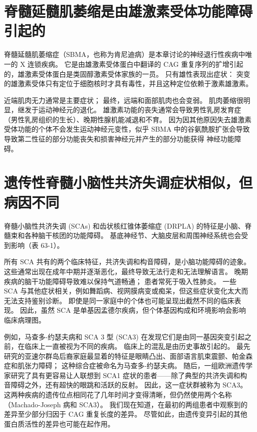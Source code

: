 \section{脊髓延髓肌萎缩是由雄激素受体功能障碍引起的}

脊髓延髓肌萎缩症（SBMA，也称为肯尼迪病）是本章讨论的神经退行性疾病中唯一的 X 连锁疾病。
它是由雄激素受体蛋白中翻译的 CAG 重复序列的扩增引起的，雄激素受体蛋白是类固醇激素受体家族的一员。
只有雄性表现出症状：
突变的雄激素受体只有定位于细胞核时才具有毒性，并且这种定位依赖于激素雄激素。


近端肌肉无力通常是主要症状；
最终，远端和面部肌肉也会变弱。
肌肉萎缩很明显，继发于运动神经元的退化。
雄激素功能的丧失通常会导致男性乳房发育症（男性乳房组织的生长）、晚期性腺机能减退和不育。
因为因其他原因失去雄激素受体功能的个体不会发生运动神经元变性，似乎 SBMA 中的谷氨酰胺扩张会导致导致第二性征的部分功能丧失和损害神经元并产生的部分功能获得 神经功能障碍。



\section{遗传性脊髓小脑性共济失调症状相似，但病因不同}

脊髓小脑性共济失调 (SCAs) 和齿状核红锥体萎缩症 (DRPLA) 的特征是小脑、脊髓束和各种脑干核团的功能障碍。
基底神经节、大脑皮层和周围神经系统也会受到影响（表 63-1）。


所有 SCA 共有的两个临床特征，共济失调和构音障碍，是小脑功能障碍的迹象。
这些通常出现在成年中期并逐渐恶化，最终导致无法行走和无法理解语言。
晚期疾病的脑干功能障碍导致难以保持气道畅通； 患者常死于吸入性肺炎。
一些 SCA 与其他症状相关，例如舞蹈病、视网膜病变或痴呆，但这些症状变化太大而无法支持鉴别诊断。
即使是同一家庭中的个体也可能呈现出截然不同的临床表现。
因此，虽然 SCA 是单基因孟德尔疾病，但个体基因构成和环境影响会影响临床病理图。


例如，马查多-约瑟夫病和 SCA 3 型 (SCA3) 在发现它们是由同一基因突变引起之前，在临床上一直被视为不同的疾病。
临床上的混乱是由历史事故引起的。
最先研究的亚速尔群岛后裔家庭最显着的特征是眼睛凸出、面部语言肌束震颤、帕金森症和肌张力障碍； 这种综合症被命名为马查多-约瑟夫病。
随后，一组欧洲遗传学家研究了具有更容易让人联想到 SCA1 症状的患者——除了典型的共济失调和构音障碍之外，还有超快的眼跳和活跃的反射。
因此，这一症状群被称为 SCA3。
这两种疾病的遗传位点相同花了几年时间才变得清晰，但仍然使用两个名称（Machado-Joseph 病和 SCA3）。
我们现在知道，在最初的两组患者中观察到的差异至少部分归因于 CAG 重复长度的差异。
尽管如此，由遗传变异引起的其他蛋白质活性的差异也可能在起作用。


